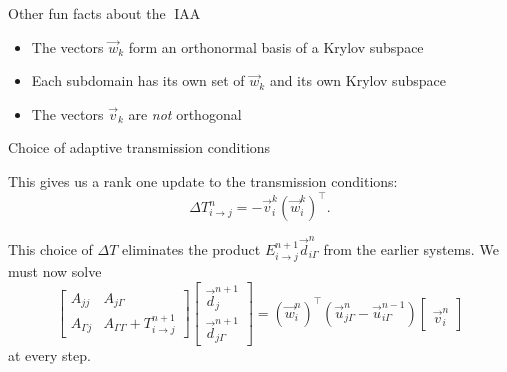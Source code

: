 \documentclass{beamer}
\DeclareMathOperator{\iaa}{IAA} %
\begin{document}
\begin{frame}{Other fun facts about the $\iaa$}

\begin{itemize}
\item The vectors $\vec{w}_k$ form an orthonormal basis of a Krylov subspace %
\item Each subdomain has its own set of $\vec{w}_k$ and its own Krylov subspace
\item The vectors $\vec{v}_k$ are \textit{not} orthogonal
\end{itemize}
\end{frame}

\begin{frame}{Choice of adaptive transmission conditions}

This gives us a rank one update to the transmission conditions:
\begin{equation*}
	\Delta T_{i \to j}^n = - \vec{v}_i^k \left ( \vec{w}_i^k \right )^\top.
\end{equation*}

This choice of $\Delta T$ eliminates the product $E_{i \to j}^{n+1} \vec{d}_{i \Gamma}^n$ from the earlier systems.
We must now solve
\begin{equation*}
	\begin{bmatrix} A_{jj} & A_{j \Gamma} \\ A_{\Gamma j} & A_{\Gamma \Gamma} + T_{i \to j}^{n+1} \end{bmatrix}
	\begin{bmatrix} \vec{d}_j^{n+1} \\ \vec{d}_{j \Gamma}^{n+1} \end{bmatrix}
	= (\vec{w}_i^n)^\top \left ( \vec{u}_{j \Gamma}^n - \vec{u}_{i \Gamma}^{n-1} \right )\begin{bmatrix} ~ \\ \vec{v}_i^n \end{bmatrix}
\end{equation*}
at every step.
\end{frame}
\end{document}
